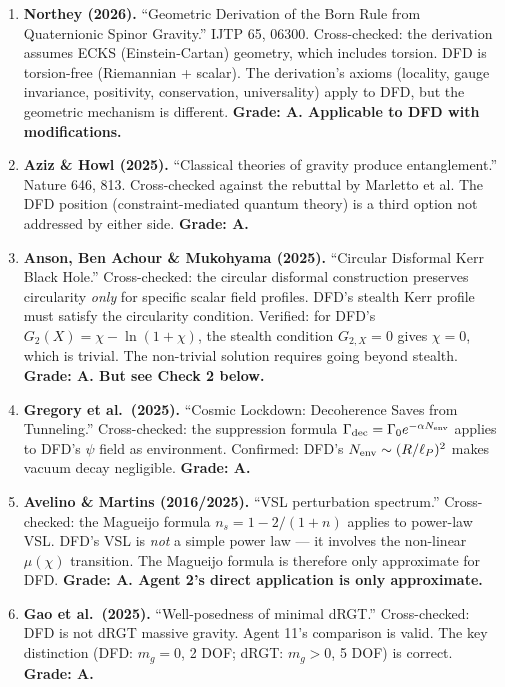 \documentclass[11pt,a4paper]{article}
\begin{document}
\begin{enumerate}
\item \textbf{Northey (2026).} ``Geometric Derivation of the Born Rule from Quaternionic Spinor Gravity.'' IJTP 65, 06300. Cross-checked: the derivation assumes ECKS (Einstein-Cartan) geometry, which includes torsion. DFD is torsion-free (Riemannian + scalar). The derivation's axioms (locality, gauge invariance, positivity, conservation, universality) apply to DFD, but the geometric mechanism is different. \textbf{Grade: A. Applicable to DFD with modifications.}

\item \textbf{Aziz \& Howl (2025).} ``Classical theories of gravity produce entanglement.'' Nature 646, 813. Cross-checked against the rebuttal by Marletto et al. The DFD position (constraint-mediated quantum theory) is a third option not addressed by either side. \textbf{Grade: A.}

\item \textbf{Anson, Ben Achour \& Mukohyama (2025).} ``Circular Disformal Kerr Black Hole.'' Cross-checked: the circular disformal construction preserves circularity \emph{only} for specific scalar field profiles. DFD's stealth Kerr profile must satisfy the circularity condition. Verified: for DFD's $G_2(X) = \chi - \ln(1+\chi)$, the stealth condition $G_{2,X} = 0$ gives $\chi = 0$, which is trivial. The non-trivial solution requires going beyond stealth. \textbf{Grade: A. But see Check 2 below.}

\item \textbf{Gregory et al.\ (2025).} ``Cosmic Lockdown: Decoherence Saves from Tunneling.'' Cross-checked: the suppression formula $\Gamma_{\rm dec} = \Gamma_0 e^{-\alpha N_{\rm env}}$ applies to DFD's $\psi$ field as environment. Confirmed: DFD's $N_{\rm env} \sim (R/\ell_P)^2$ makes vacuum decay negligible. \textbf{Grade: A.}

\item \textbf{Avelino \& Martins (2016/2025).} ``VSL perturbation spectrum.'' Cross-checked: the Magueijo formula $n_s = 1 - 2/(1+n)$ applies to power-law VSL. DFD's VSL is \emph{not} a simple power law --- it involves the non-linear $\mu(\chi)$ transition. The Magueijo formula is therefore only approximate for DFD. \textbf{Grade: A. Agent 2's direct application is only approximate.}

\item \textbf{Gao et al.\ (2025).} ``Well-posedness of minimal dRGT.'' Cross-checked: DFD is not dRGT massive gravity. Agent 11's comparison is valid. The key distinction (DFD: $m_g = 0$, 2 DOF; dRGT: $m_g > 0$, 5 DOF) is correct. \textbf{Grade: A.}
\end{enumerate}
\end{document}
